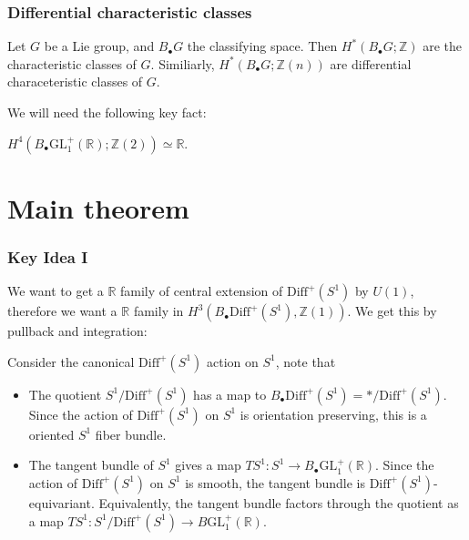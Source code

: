 \documentclass{beamer}
\newcommand{\Z}{\mathbb Z}
\newcommand{\R}{\mathbb R}
\newcommand{\GL}{\mathrm{GL}}
\newcommand{\Bdot}{B_\bullet}
\newcommand{\Diff}{\mathrm{Diff}^+(S^1)}
\begin{document}
\begin{frame}
    \frametitle{Differential characteristic classes}
    Let $G$ be a Lie group, and $\Bdot G$ the classifying space. Then $H^*(\Bdot G; \Z)$ 
    are the characteristic classes of $G$. Similiarly, $H^*(\Bdot G; \Z(n))$ are differential 
    characeteristic classes of $G$. \pause \vspace{5mm}

    We will  need the following key fact:
    \begin{theorem}[Bott]
        $H^4(\Bdot\GL_1^+(\R); \Z(2)) \simeq \R$.
    \end{theorem}
\end{frame}


\section{Main theorem}
\begin{frame}
    \frametitle{Key Idea I}
    We want to get a $\R$ family of central extension of $\Diff$ by $U(1)$, therefore 
    we want a $\R$ family in $H^3(\Bdot\Diff, \Z(1))$. We get this by pullback and integration: \pause 

    \vspace{5mm} 
    Consider the canonical $\Diff$ action on $S^1$, note that 
    \begin{itemize}
        \item <1 -> The quotient $S^1/\Diff$ has a map to $\Bdot\Diff = * /\Diff$.
        Since the action of $\Diff$ on $S^1$ is orientation preserving, this is a oriented 
        $S^1$ fiber bundle.
        \item <2 -> The tangent bundle of $S^1$ gives a map $TS^1: S^1 \to \Bdot\GL^+_1(\R)$. Since
        the action of $\Diff$ on $S^1$ is smooth, the tangent bundle is $\Diff$-equivariant. Equivalently,
        the tangent bundle factors through the quotient as a map $TS^1: S^1/\Diff \to B\GL^+_1(\R)$.
    \end{itemize}
\end{frame}
\end{document}

